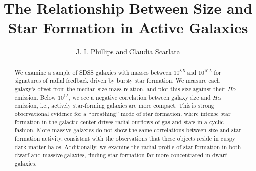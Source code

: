 \documentclass[iop]{emulateapj}
\begin{document}

\title{The Relationship Between Size and Star Formation in Active Galaxies}


\author{J. I. Phillips and Claudia Scarlata }




\begin{abstract}
We examine a sample of SDSS galaxies with masses between $10^{8.5}$ and $10^{10.5}$ for signatures of radial feedback driven by bursty star formation. We measure each galaxy's offset from the median size-mass relation, and plot this size against their $H\alpha$ emission. Below $10^{9.5}$, we see a negative correlation between galaxy size and $H\alpha$ emission, i.e., actively star-forming galaxies are more compact. This is strong observational evidence for a ``breathing'' mode of star formation, where intense star formation in the galactic center drives radial outflows of gas and stars in a cyclic fashion. More massive galaxies do not show the same correlations between size and star formation activity, consistent with the observations that these objects reside in cuspy dark matter halos. Additionally, we examine the radial profile of star formation in both dwarf and massive galaxies, finding star formation far more concentrated in dwarf galaxies.
\end{abstract}
\end{document}
